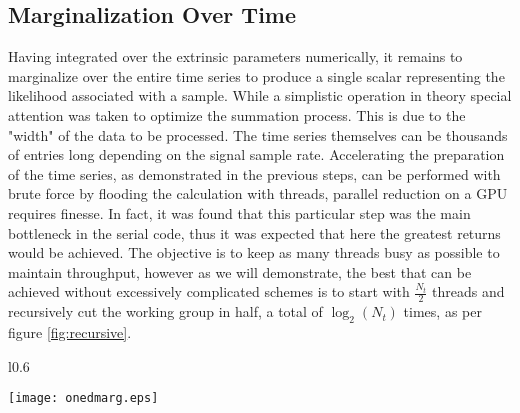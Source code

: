\documentclass[paper=a4, fontsize=11pt]{scrartcl} %
\numberwithin{equation}{section} %
\numberwithin{figure}{section} %
\numberwithin{table}{section} %
\begin{document}
\subsection{Marginalization Over Time}
Having integrated over the extrinsic parameters numerically, it remains to marginalize over the entire time series to produce a single scalar representing the likelihood associated with a sample. While a simplistic operation in theory special attention was taken to optimize the summation process. This is due to the "width" of the data to be processed. The time series themselves can be thousands of entries long depending on the signal sample rate. Accelerating the preparation of the time series, as demonstrated in the previous steps, can be performed with brute force by flooding the calculation with threads, parallel reduction on a GPU requires finesse. In fact, it was found that this particular step was the main bottleneck in the serial code, thus it was expected that here the greatest returns would be achieved. The objective is to keep as many threads busy as possible to maintain throughput, however as we will demonstrate, the best that can be achieved without excessively complicated schemes is to start with $\frac{N_t}{2}$ threads and recursively cut the working group in half, a total of $\log_2(N_t)$ times, as per figure \ref{fig:recursive}. 


\begin{wrapfigure}{l}{0.6\textwidth}
\label{fig:recursive}
\caption{Sequential addressing for parallel reduction.}
\begin{center}
\texttt{[image: onedmarg.eps]}
\end{center}
\end{wrapfigure}
\end{document}
